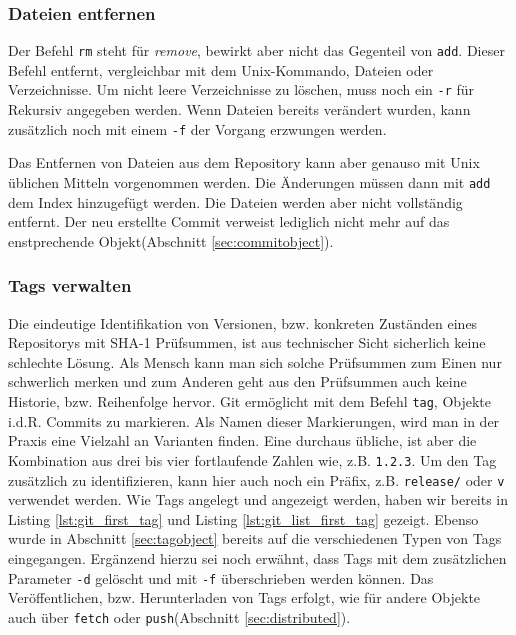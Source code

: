 

\subsubsection{Dateien entfernen}
Der Befehl \texttt{rm} steht für \textit{remove}, bewirkt aber nicht das
Gegenteil von \texttt{add}. Dieser Befehl entfernt, vergleichbar mit dem
Unix-Kommando, Dateien oder Verzeichnisse. Um nicht leere Verzeichnisse zu
löschen, muss noch ein \texttt{-r} für Rekursiv angegeben werden. Wenn Dateien
bereits verändert wurden, kann zusätzlich noch mit einem \texttt{-f} der
Vorgang erzwungen werden.



Das Entfernen von Dateien aus dem Repository kann aber genauso mit Unix
üblichen Mitteln vorgenommen werden. Die Änderungen müssen dann mit
\texttt{add} dem Index hinzugefügt werden. Die Dateien werden aber nicht
vollständig entfernt. Der neu erstellte Commit verweist lediglich nicht mehr
auf das enstprechende Objekt(Abschnitt
\ref{sec:commitobject}).\cite[S.~43-44]{gitosp}

\subsubsection{Tags verwalten}\label{sec:managetags}
Die eindeutige Identifikation von Versionen, bzw. konkreten Zuständen eines
Repositorys mit \gls{SHA-1} Prüfsummen, ist aus technischer Sicht sicherlich
keine schlechte Lösung. Als Mensch kann man sich solche Prüfsummen zum Einen
nur schwerlich merken und zum Anderen geht aus den Prüfsummen auch keine
Historie, bzw. Reihenfolge hervor. Git ermöglicht mit dem Befehl \texttt{tag},
Objekte i.d.R. Commits zu markieren. Als Namen dieser Markierungen, wird man in
der Praxis eine Vielzahl an Varianten finden. Eine durchaus übliche, ist aber
die Kombination aus drei bis vier fortlaufende Zahlen wie, z.B. \texttt{1.2.3}.
Um den Tag zusätzlich zu identifizieren, kann hier auch noch ein Präfix, z.B.
\texttt{release/} oder \texttt{v} verwendet werden. Wie Tags angelegt und
angezeigt werden, haben wir bereits in Listing \ref{lst:git_first_tag} und
Listing \ref{lst:git_list_first_tag} gezeigt. Ebenso wurde in Abschnitt
\ref{sec:tagobject} bereits auf die verschiedenen Typen von Tags eingegangen.
Ergänzend hierzu sei noch erwähnt, dass Tags mit dem zusätzlichen Parameter
\texttt{-d} gelöscht und mit \texttt{-f} überschrieben werden können.
Das Veröffentlichen, bzw. Herunterladen von Tags erfolgt, wie für andere Objekte
auch über \texttt{fetch} oder \texttt{push}(Abschnitt \ref{sec:distributed}).

